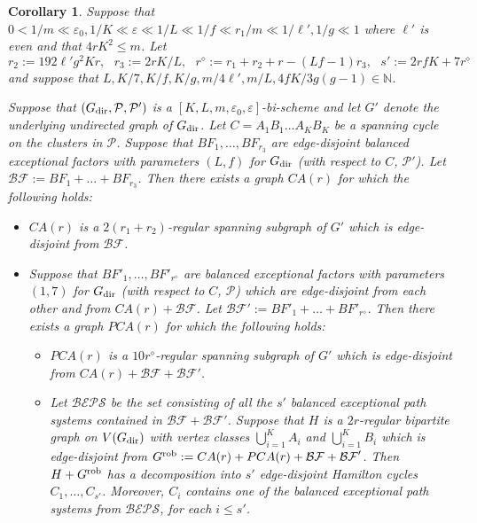 \documentclass{memo-l}
\newtheorem{cor}[firstthm]{Corollary}
\def\COMMENT#1{}
\def\cP{\mathcal{P}}
\def\eps{\varepsilon}
\numberwithin{section}{chapter}
\numberwithin{equation}{section}
\numberwithin{firstthm}{section}
\numberwithin{figure}{section}
\begin{document}
{\begin{cor} \label{rdeccorz}
Suppose that $0<1/m\ll \eps_0,1/K\ll \eps \ll 1/L \ll 1/f \ll r_1/m\ll 1/\ell',1/g\ll 1$ 
where $\ell '$ is even and
that $4rK^2\le m$.%
\COMMENT{osthus: changed from $4rK^2$} Let
$$r_2:=192\ell'g^2Kr, \ \ \ r_3:=2rK/L, \ \ \ r^\diamond:=r_1+r_2+r-(Lf-1)r_3, \ \ \ s':=2rfK+7r^\diamond
$$
and suppose that $L, K/7, K/f, K/g, m/4\ell', m/L, 4fK/3g(g-1) \in \mathbb{N}$.%
   \COMMENT{Daniela added $L\in \mathbb{N}$}
Suppose that $(G_{\rm dir},\cP,\cP')$ is a $[K,L,m,\eps_0,\eps]$-bi-scheme and let $G'$ denote the underlying undirected graph
of $G_{\rm dir}$. Let $C=A_1B_1\dots A_KB_K$ be a spanning cycle on the clusters in $\cP$. 
Suppose that $BF_1,\dots, BF_{r_3}$ are edge-disjoint balanced exceptional factors with parameters $(L,f)$ for $G_{\rm dir}$ 
(with respect to $C$, $\mathcal P'$). Let $\mathcal{BF}:=BF_1+\dots + BF_{r_3}$.
Then there exists a graph $CA(r)$ for which the following holds:
\begin{itemize}
\item[{\rm (i)}] $CA(r)$ is a $2(r_1+r_2)$-regular spanning subgraph of $G'$ which is edge-disjoint from $\mathcal{BF}$.
\item[{\rm (ii)}] Suppose that $BF'_1,\dots, BF'_{r^\diamond}$ are balanced exceptional factors with parameters $(1,7)$ for $G_{\rm dir}$
(with respect to $C$, $\mathcal P$) which are edge-disjoint from each other and from $CA(r)+ \mathcal{BF}$.
Let $\mathcal{BF}':=BF'_1+\dots + BF'_{r^\diamond}$.
Then there exists a graph $PCA(r)$ for which the following holds:
\begin{itemize}
\item[{\rm (a)}] $PCA(r)$ is a $10r^\diamond$-regular spanning subgraph of $G'$ which
is edge-disjoint from $CA(r)+ \mathcal{BF}+ \mathcal{BF}'$.
\item[{\rm (b)}] Let $\mathcal{BEPS}$ be the set consisting of all the $s'$ balanced exceptional path systems
contained in $\mathcal{BF}+ \mathcal{BF}'$.
Suppose that $H$ is a $2r$-regular bipartite graph on $V(G_{\rm dir})$ with vertex classes $\bigcup_{i=1}^K A_i$ and $\bigcup_{i=1}^K B_i$
which is edge-disjoint from $G^{\rm rob}:=CA(r)+ PCA(r)+ \mathcal{BF}+ \mathcal{BF}'$.
Then $H+ G^{\rm rob}$ has a decomposition into $s'$
edge-disjoint Hamilton cycles $C_1,\dots,C_{s'}$.
Moreover, $C_i$ contains one of the balanced exceptional path systems from $\mathcal{BEPS}$, for each $i\le s'$.
\end{itemize}
\end{itemize}
\end{cor}
}
\end{document}
